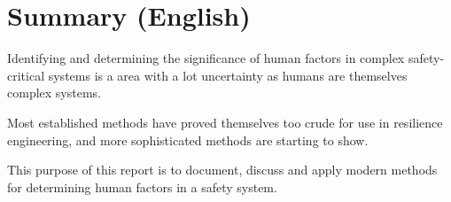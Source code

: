 \chapter{Summary (English)}
Identifying and determining the significance of human factors in complex safety-critical systems is a area with a lot uncertainty as humans are themselves complex systems.

Most established methods have proved themselves too crude for use in resilience engineering, and more sophisticated methods are starting to show.

This purpose of this report is to document, discuss and apply modern methods for determining human factors in a safety system.

